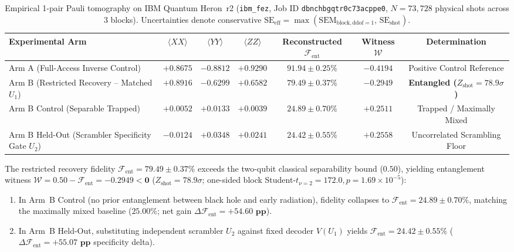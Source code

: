 \documentclass[aps,preprint,superscriptaddress,longbibliography]{revtex4-2}
\begin{document}
\begin{table}[H]
\centering
\caption{Empirical 1-pair Pauli tomography on IBM Quantum Heron~r2 (\texttt{ibm\_fez}, Job ID \texttt{dbnchbgqtr0c73acppe0}, $N = 73{,}728$ physical shots across 3 blocks). Uncertainties denote conservative $\mathrm{SE}_{\mathrm{eff}} = \max(\mathrm{SEM}_{\mathrm{block,ddof=1}},\, \mathrm{SE}_{\mathrm{shot}})$.}
\label{tab:hp_three_arm_results}
\begin{tabular}{lcccccc}
\toprule
Experimental Arm & $\langle XX \rangle$ & $\langle YY \rangle$ & $\langle ZZ \rangle$ & Reconstructed $\mathcal{F}_{\mathrm{ent}}$ & Witness $\mathcal{W}$ & Determination \\
\midrule
Arm A (Full-Access Inverse Control) & $+0.8675$ & $-0.8812$ & $+0.9290$ & $\mathbf{91.94 \pm 0.25\%}$ & $-0.4194$ & Positive Control Reference \\
Arm B (Restricted Recovery -- Matched $U_1$) & $+0.8916$ & $-0.6299$ & $+0.6582$ & $\mathbf{79.49 \pm 0.37\%}$ & $\mathbf{-0.2949}$ & \textbf{Entangled ($Z_{\mathrm{shot}} = 78.9\sigma$)} \\
Arm B Control (Separable Trapped) & $+0.0052$ & $+0.0133$ & $+0.0039$ & $24.89 \pm 0.70\%$ & $+0.2511$ & Trapped / Maximally Mixed \\
Arm B Held-Out (Scrambler Specificity Gate $U_2$) & $-0.0124$ & $+0.0348$ & $+0.0241$ & $24.42 \pm 0.55\%$ & $+0.2558$ & Uncorrelated Scrambling Floor \\
\bottomrule
\end{tabular}
\end{table}

The restricted recovery fidelity $\mathcal{F}_{\mathrm{ent}} = \mathbf{79.49 \pm 0.37\%}$ exceeds the two-qubit classical separability bound ($0.50$), yielding entanglement witness $\mathcal{W} = 0.50 - \mathcal{F}_{\mathrm{ent}} = \mathbf{-0.2949 < 0}$ ($Z_{\mathrm{shot}} = 78.9\sigma$; one-sided block Student-$t_{\nu=2} = 172.0, p = 1.69 \times 10^{-5}$):
\begin{enumerate}
\item In Arm~B Control (no prior entanglement between black hole and early radiation), fidelity collapses to $\mathcal{F}_{\mathrm{ent}} = 24.89 \pm 0.70\%$, matching the maximally mixed baseline ($25.00\%$; net gain $\Delta \mathcal{F}_{\mathrm{ent}} = \mathbf{+54.60\text{ pp}}$).
\item In Arm~B Held-Out, substituting independent scrambler $U_2$ against fixed decoder $V(U_1)$ yields $\mathcal{F}_{\mathrm{ent}} = 24.42 \pm 0.55\%$ ($\Delta \mathcal{F}_{\mathrm{ent}} = \mathbf{+55.07\text{ pp}}$ specificity delta).
\end{enumerate}
\end{document}
